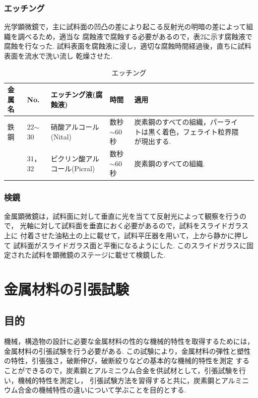 \documentclass[10pt，a4j]{jsarticle}
\begin{document}
    \subsubsection{エッチング}
    光学顕微鏡で，主に試料面の凹凸の差により起こる反射光の明暗の差によって組織を調べるため，適当な
    腐蝕液で腐蝕する必要があるので，表2に示す腐蝕液で腐蝕を行なった. 
    試料表面を腐蝕液に浸し，適切な腐蝕時間経過後，直ちに試料表面を流水で洗い流し
    乾燥させた.
    \begin{table}[H]
      \centering
      \caption{エッチング}
      \label{my-label}
      \footnotesize
      \begin{tabular}{llllll}
        金属名 & No.        & エッチング液(腐蝕液)        & 時間 & 適用          \\ \hline
        鉄鋼  & 22$\sim$30 & 硝酸アルコール(Nital)      & 数秒$\sim$60秒 & 炭素鋼のすべての組織，パーライトは黒く着色，フェライト粒界隈が現出する. \\
            & 31，32      & ピクリン酸アルコール(Picral) & 数秒$\sim$60秒 & 炭素鋼のすべての組織.
      \end{tabular}
    \end{table}
    \subsubsection{検鏡}
    金属顕微鏡は，試料面に対して垂直に光を当てて反射光によって観察を行うので，
    光軸に対して試料面を垂直におく必要があるので，試料をスライドガラス上に
    付着させた油粘土の上に載せて，試料平圧器を用いて，上から静かに押して
    試料面がスライドガラス面と平衡になるようにした.
    このスライドガラスに固定された試料を顕微鏡のステージに載せて検鏡した.

  
\section{金属材料の引張試験}
  \subsection{目的}
  機械，構造物の設計に必要な金属材料の性的な機械的特性を取得するためには，金属材料の引張試験を行う必要がある.
  この試験により，金属材料の弾性と塑性の特性，引張強さ，破断伸び，破断絞りなどの基本的な機械的特性を測定
  することができるので，炭素鋼とアルミニウム合金を供試材として，引張試験を行い，機械的特性を測定し，
  引張試験方法を習得すると共に，炭素鋼とアルミニウム合金の機械特性の違いについて学ぶことを目的とする.
\end{document}
